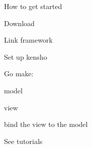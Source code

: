 How to get started


\begin{DoxyItemize}
\item Download
\item Link framework
\item Set up kensho
\item Go make\+:
\begin{DoxyItemize}
\item model
\item view
\item bind the view to the model
\end{DoxyItemize}
\item See tutorials 
\end{DoxyItemize}
